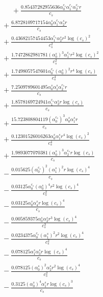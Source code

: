 \documentclass[10pt]{article}
\begin{document}
\begin{align*}
\phantom{R_{2,7}} &\phantom{={}}{}  + \frac{0.85437282955636 \alpha_{0}^{c_s} \alpha_{1}^{c_s} \alpha_{2}^{c_s} r}{c_{s}} \\
&{}  + \frac{6.8728109717154 \alpha_{0}^s \alpha_{1}^{c_s} \alpha_{2}^s r}{c_{s}} \\
&{}  + \frac{0.43682157454453 \alpha_{1}^{c_s} \alpha_{2}^s r^{2} \log{\left(c_{s} \right)}^{2}}{c_{s}^{2}} \\
&{}  + \frac{1.7472862981781 \left(\alpha_{0}^s\right)^{3} \alpha_{1}^{c_s} r^{2} \log{\left(c_{s} \right)}^{2}}{c_{s}^{2}} \\
&{}  + \frac{1.7498057547601 \alpha_{0}^{c_s} \left(\alpha_{0}^s\right)^{2} r^{4} \log{\left(c_{s} \right)}}{c_{s}^{4}} \\
&{}  + \frac{7.2509789601495 \alpha_{0}^s \alpha_{1}^s \alpha_{2}^{c_s} r}{c_{s}} \\
&{}  + \frac{1.8578169724941 \alpha_{1}^{c_s} \alpha_{3}^s r \log{\left(c_{s} \right)}}{c_{s}} \\
&{}  + \frac{15.723808804119 \left(\alpha_{0}^{c_s}\right)^{3} \alpha_{0}^s \alpha_{1}^s r}{c_{s}} \\
&{}  + \frac{0.12301526016263 \alpha_{0}^s \alpha_{1}^s r^{4} \log{\left(c_{s} \right)}^{2}}{c_{s}^{4}} \\
&{}  + \frac{1.9893077070381 \left(\alpha_{0}^s\right)^{3} \alpha_{2}^{c_s} r \log{\left(c_{s} \right)}}{c_{s}} \\
&{}  - \frac{0.015625 \left(\alpha_{0}^{c_s}\right)^{2} \left(\alpha_{1}^s\right)^{2} r \log{\left(c_{s} \right)}^{4}}{c_{s}} \\
&{}  - \frac{0.03125 \alpha_{0}^{c_s} \left(\alpha_{0}^s\right)^{4} r^{2} \log{\left(c_{s} \right)}^{4}}{c_{s}^{2}} \\
&{}  - \frac{0.03125 \alpha_{0}^s \alpha_{4}^s r \log{\left(c_{s} \right)}^{4}}{c_{s}} \\
&{}  - \frac{0.005859375 \alpha_{0}^s \alpha_{2}^s r^{3} \log{\left(c_{s} \right)}^{4}}{c_{s}^{3}} \\
&{}  - \frac{0.0234375 \alpha_{0}^{c_s} \left(\alpha_{1}^s\right)^{2} r^{2} \log{\left(c_{s} \right)}^{4}}{c_{s}^{2}} \\
&{}  - \frac{0.078125 \alpha_{1}^s \alpha_{3}^s r \log{\left(c_{s} \right)}^{4}}{c_{s}} \\
&{}  - \frac{0.078125 \left(\alpha_{0}^s\right)^{2} \alpha_{2}^s r^{2} \log{\left(c_{s} \right)}^{4}}{c_{s}^{2}} \\
&{}  - \frac{0.3125 \left(\alpha_{0}^s\right)^{4} \alpha_{1}^s r \log{\left(c_{s} \right)}^{3}}{c_{s}} \\

\end{align*}
\end{document}

